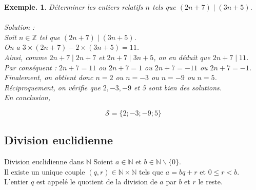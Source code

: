 \documentclass[12pt]{article}
\newcommand{\hideM}[1]{#1}
\theoremstyle{break}
\newtheorem*{example}{Exemple.}
\begin{document}
\begin{example}
Déterminer les entiers relatifs $n$ tels que $(2 n+7) \mid(3 n+5)$.\\\\
Solution :\\
Soit $n \in \mathbb{Z}$ tel que $(2 n+7) \mid(3 n+5)$.\\
On a $3 \times(2 n+7)-2 \times(3 n+5)=11$.\\
Ainsi, comme $2 n+7 \mid 2 n+7$ et $2 n+7 \mid 3 n+5$, on en déduit que $2 n+7 \mid 11$.\\
Par conséquent : $2 n+7=11$ ou $2 n+7=1$ ou $2 n+7=-11$ ou $2 n+7=-1$.\\
Finalement, on obtient donc $n=2$ ou $n=-3$ ou $n=-9$ ou $n=5$.\\
Réciproquement, on vérifie que $2,-3,-9$ et 5 sont bien des solutions.\\
En conclusion,

$$
\mathcal{S}=\{2 ;-3 ;-9 ; 5\}
$$
\end{example}

\subsection{Division euclidienne}
\begin{proposition}{Division euclidienne dans $\mathbb{N}$}{}
    Soient $a \in \mathbb{N}$ et $b \in \mathbb{N} \backslash\{0\}$.\\
    Il existe un unique couple $(q, r) \in \mathbb{N} \times \mathbb{N}$ tels que $\hideM{a=b q+r}$ et $\hideM{0 \leqslant r<b}$. L'entier $q$ est appelé le quotient de la division de $a$ par $b$ et $r$ le reste.
\end{proposition}
\end{document}

